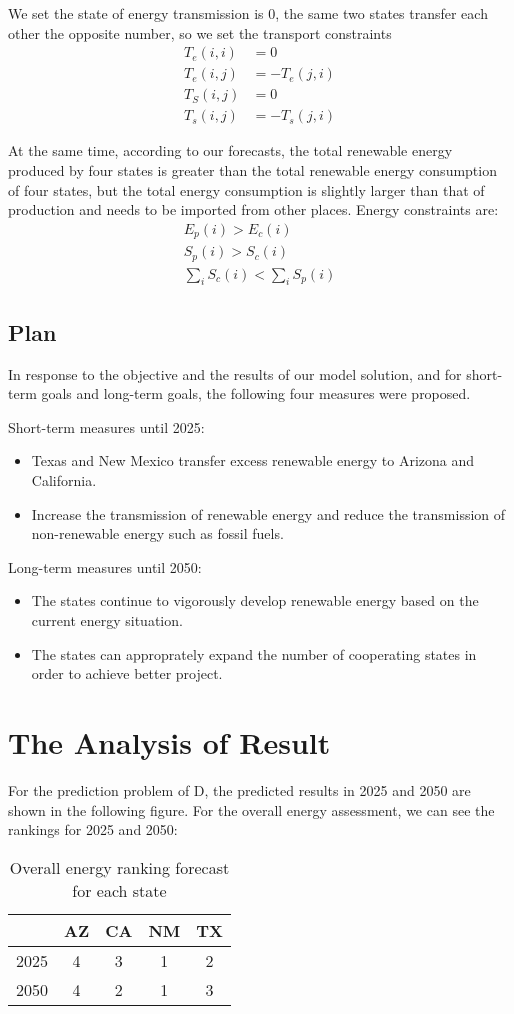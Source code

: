 \documentclass{mcmthesis}
\begin{document}
We set the state of energy transmission is 0, the same two states transfer each other the opposite number, so we set the transport constraints
\begin{align}
  T_e(i,i) &= 0 \\
  T_e(i,j) &= -T_e(j,i) \\
  T_S(i,j) &= 0 \\
  T_s(i,j) &= -T_s(j,i)
\end{align}

At the same time, according to our forecasts, the total renewable energy produced by four states is greater than the total renewable energy consumption of four states, but the total energy consumption is slightly larger than that of production and needs to be imported from other places. Energy constraints are:
\begin{align}
  E_p(i) > E_c(i) \\
  S_p(i) > S_c(i) \\
  \sum\limits_{i}S_c(i) < \sum\limits_{i}S_p(i) 
\end{align}
\subsection{Plan}

In response to the objective and the results of our model solution, and for short-term goals and long-term goals, the following four measures were proposed.

Short-term measures until 2025:
\begin{itemize}
  \item Texas and New Mexico transfer excess renewable energy to Arizona and California.
  \item Increase the transmission of renewable energy and reduce the transmission of non-renewable energy such as fossil fuels.
\end{itemize}
Long-term measures until 2050:
\begin{itemize}
  \item The states continue to vigorously develop renewable energy based on the current energy situation.
  \item The states can approprately expand the number of cooperating states in order to achieve better project. 
\end{itemize}

\section{The Analysis of Result}
For the prediction problem of D, the predicted results in 2025 and 2050 are shown in the following figure. For the overall energy assessment, we can see the rankings for 2025 and 2050:
\begin{table}[H]
\centering
\caption{Overall energy ranking forecast for each state}
\label{oerf}
\begin{tabular}{|c|c|c|c|c|}
\hline
   &   AZ & CA & NM & TX   \\ \hline
2025 & 4  & 3  & 1  & 2 \\ \hline
2050 & 4  & 2  & 1  & 3 \\ \hline
\end{tabular}
\end{table}
\end{document}
